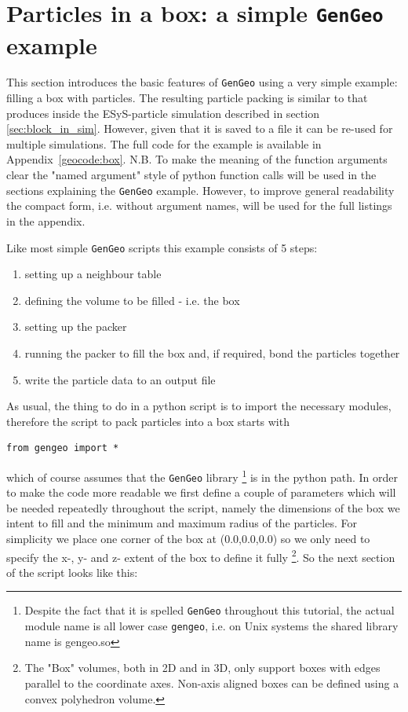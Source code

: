 \section{Particles in a box: a simple \texttt{GenGeo} example}
\label{sec:simple_box}

This section introduces the basic features of \texttt{GenGeo} using a very simple example: filling a box with particles. The resulting particle packing is similar to that produces inside the ESyS-particle simulation described in section \ref{sec:block_in_sim}. However, given that it is saved to a file it can be re-used for multiple simulations. The full code for the example is available in Appendix~\ref{geocode:box}. N.B. To make the meaning of the function arguments clear the "named argument" style of python function calls will be used in the sections explaining the \texttt{GenGeo} example. However, to improve general readability the compact form, i.e. without argument names, will be used for the full listings in the appendix. \par
Like most simple \texttt{GenGeo} scripts this example consists of 5 steps:
\begin{enumerate}
\item setting up a neighbour table
\item defining the volume to be filled - i.e. the box
\item setting up the packer
\item running the packer to fill the box and, if required, bond the particles together
\item write the particle data to an output file 
\end{enumerate}  
As usual, the thing to do in a python script is to import the necessary modules, therefore the script to pack particles into a box starts with 
\begin{verbatim}
from gengeo import *
\end{verbatim}
which of course assumes that the  \texttt{GenGeo} library \footnote{Despite the fact that it is spelled \texttt{GenGeo} throughout this tutorial, the actual module name is all lower case \texttt{gengeo}, i.e. on Unix systems the shared library name is gengeo.so } is in the python path. In order to make the code more readable we first define a couple of parameters which will be needed repeatedly throughout the script, namely the dimensions of the box we intent to fill and the minimum and maximum radius of the particles. For simplicity we place one corner of the box at (0.0,0.0,0.0) so we only need to specify the x-, y- and z- extent of the box to define it fully \footnote{The "Box" volumes, both in 2D and in 3D, only support boxes with edges parallel to the coordinate axes. Non-axis aligned boxes can be defined using a convex polyhedron volume.}. So the next section of the script looks like this:
